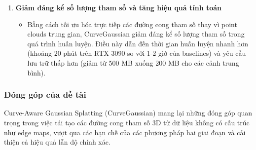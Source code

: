 \begin{enumerate}
\begin{itemize}
    \end{itemize}
    \item \textbf{Giảm đáng kể số lượng tham số và tăng hiệu quả tính toán}
    \begin{itemize}
        \item Bằng cách tối ưu hóa trực tiếp các đường cong tham số thay vì point clouds trung gian, CurveGaussian giảm đáng kể số lượng tham số trong quá trình huấn luyện. Điều này dẫn đến thời gian huấn luyện nhanh hơn (khoảng 20 phút trên RTX 3090 so với 1-2 giờ của baselines) và yêu cầu lưu trữ thấp hơn (giảm từ 500 MB xuống 200 MB cho các cảnh trung bình).
    \end{itemize}
\end{enumerate}

\subsubsection{Đóng góp của đề tài}
Curve-Aware Gaussian Splatting (CurveGaussian) mang lại những đóng góp quan trọng trong việc tái tạo các đường cong tham số 3D từ dữ liệu không có cấu trúc như edge maps, vượt qua các hạn chế của các phương pháp hai giai đoạn và cải thiện cả hiệu quả lẫn độ chính xác. \\

